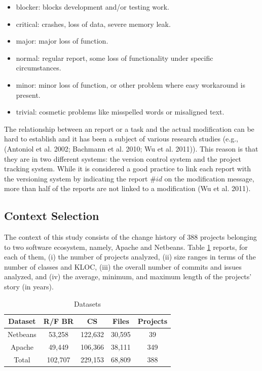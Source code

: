 \documentclass[natbib]{svjour3}
\providecommand{\tightlist}{%
  \setlength{\itemsep}{0pt}\setlength{\parskip}{0pt}}
\begin{document}
\begin{itemize}
\tightlist
\item
  blocker: blocks development and/or testing work.
\item
  critical: crashes, loss of data, severe memory leak.
\item
  major: major loss of function.
\item
  normal: regular report, some loss of functionality under specific
  circumstances.
\item
  minor: minor loss of function, or other problem where easy workaround
  is present.
\item
  trivial: cosmetic problems like misspelled words or misaligned text.
\end{itemize}

The relationship between an report or a task and the actual modification
can be hard to establish and it has been a subject of various research
studies (e.g., (Antoniol et al. 2002; Bachmann et al. 2010; Wu et al.
2011)). This reason is that they are in two different systems: the
version control system and the project tracking system. While it is
considered a good practice to link each report with the versioning
system by indicating the report \(\#id\) on the modification message,
more than half of the reports are not linked to a modification (Wu et
al. 2011).

\subsection{Context Selection}\label{context-selection}

The context of this study consists of the change history of 388 projects
belonging to two software ecosystem, namely, Apache and Netbeans. Table
\ref{table:datasets} reports, for each of them, (i) the number of
projects analyzed, (ii) size ranges in terms of the number of classes
and KLOC, (iii) the overall number of commits and issues analyzed, and
(iv) the average, minimum, and maximum length of the projects' story (in
years).

\begin{table}[h]
\begin{center}
\begin{tabular}{@{}c|c|c|c|c@{}}
\textbf{Dataset} & \textbf{R/F BR} & \textbf{CS} & \textbf{Files} & \textbf{Projects} \\ \hline \hline
Netbeans         & 53,258          & 122,632     & 30,595         & 39                \\
Apache           & 49,449          & 106,366     & 38,111         & 349               \\
Total            & 102,707         & 229,153     & 68,809         & 388               \\ \hline \hline

\end{tabular}
\end{center}

\caption{Datasets\label{table:datasets}}
\end{table}
\end{document}
